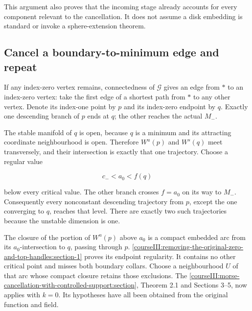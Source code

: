 This argument also proves that the incoming stage already accounts for every component relevant to the cancellation. It does not assume a disk embedding is standard or invoke a sphere-extension theorem.

\subsection{Cancel a boundary-to-minimum edge and repeat}
\label{courseIII:removing-the-original-zero-and-top-handles:zero-supported-cancellation}

\label{courseIII:removing-the-original-zero-and-top-handles:section-3}\label{courseIII:zero-top:3}

If any index-zero vertex remains, connectedness of \(\mathcal G\) gives an edge from \(*\) to an index-zero vertex: take the first edge of a shortest path from \(*\) to any other vertex. Denote its index-one point by \(p\) and its index-zero endpoint by \(q\). Exactly one descending branch of \(p\) ends at \(q\); the other reaches the actual \(M_-\).

The stable manifold of \(q\) is open, because \(q\) is a minimum and its attracting coordinate neighbourhood is open. Therefore \(W^u(p)\) and \(W^s(q)\) meet transversely, and their intersection is exactly that one trajectory. Choose a regular value

\begin{equation}
c_-<a_0<f(q)
 \label{courseIII:removing-the-original-zero-and-top-handles:eq:3.1}
\end{equation}

below every critical value. The other branch crosses \(f=a_0\) on its way to \(M_-\). Consequently every nonconstant descending trajectory from \(p\), except the one converging to \(q\), reaches that level. There are exactly two such trajectories because the unstable dimension is one.

The closure of the portion of \(W^u(p)\) above \(a_0\) is a compact embedded arc from its \(a_0\)-intersection to \(q\), passing through \(p\). \cref{courseIII:removing-the-original-zero-and-top-handles:section-1} proves its endpoint regularity. It contains no other critical point and misses both boundary collars. Choose a neighbourhood \(U\) of that arc whose compact closure retains those exclusions. The \cref{courseIII:morse-cancellation-with-controlled-support:section}, Theorem 2.1 and Sections 3--5, now applies with \(k=0\). Its hypotheses have all been obtained from the original function and field.


